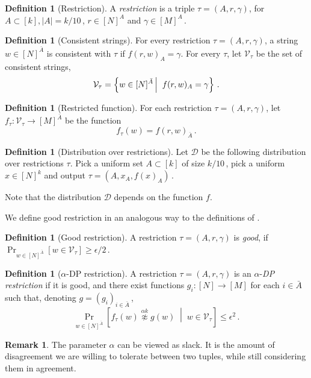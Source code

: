 \documentclass[11pt]{article}
\numberwithin{equation}{section}
\theoremstyle{definition}
\newtheorem{definition}[theorem]{Definition}
\newtheorem{remark}[theorem]{Remark}
\theoremstyle{plain}
\newcommand{\Prob}[2][]{\Pr_{{#1}}\left[#2\right]} %
\newcommand{\brac}[1]{[#1]} %
\newcommand{\abs}[1]{\lvert#1\rvert} %
\newcommand{\given}{\;\middle\vert\;} %
\newcommand\sett[2]{\left\{ #1 \left| \; \vphantom{#1 #2} \right. #2  \right\}} %
\newcommand\f{f} %
\newcommand{\g}{g} %
\newcommand\neqg[1]{\stackrel{{#1}}{ \not\approx}} %
\newcommand\cons{\mathcal{V}} %
\newcommand\rest[1]{{\bar{#1}}}  %
\begin{document}
\begin{definition}[Restriction]
A \emph{restriction} is a triple $\tau = (A,r,\gamma)$, for $A\subset[k],\abs{A}=k/10$\,, $r\in[N]^A$ and $\gamma\in[M]^A$\,.
\end{definition}
%
\begin{definition}[Consistent strings]
	For every restriction $\tau = (A,r,\gamma)$, a string $w\in[N]^{\rest{A}}$ is consistent with $\tau$ if $ \f(r,w)_A =\gamma $.
	For every $\tau$, let $\cons_{\tau}$ be the set of consistent strings,
	\[\cons_{\tau} = \sett{ w\in[N]^{\rest{A}}}{  \f(r,w)_A =\gamma }\,.\] %
\end{definition}
%
\begin{definition}[Restricted function]
	For each restriction $\tau = (A,r,\gamma)$, let $f_{\tau}:\cons_\tau\rightarrow[M]^{\bar{A}}$ be the function
	\[f_{\tau}(w) = \f(r,w)_\rest{A}\,.\] %
\end{definition}

\begin{definition}[Distribution over restrictions]\label{def:distribution}
	Let $\mathcal{D}$ be the following distribution over restrictions $\tau$. Pick a uniform set $A\subset[k]$ of size $k/10$\,, pick a uniform $x\in[N]^k$ and output $\tau = (A,x_A,\f(x)_A)$\,.
\end{definition}
Note that the distribution $\mathcal{D}$ depends on the function $f$.

We define good restriction in an analogous way to the definitions of \cite{impagliazzo2012new}. 

\begin{definition}[Good restriction]\label{def:good rest}
	A restriction $\tau = (A,r,\gamma)$ is \emph{good}, if $ \Pr_{w\in[N]^{\rest{A}}}[w\in \cons_{\tau}] \geq 
	\epsilon/2$\,. %
\end{definition}

\begin{definition}[$\alpha$-DP restriction]\label{def:DP rest}
	A restriction $\tau = (A,r,\gamma)$ is an $\alpha$-\emph{DP restriction} if it is good, and there exist functions $\g_i:[N]\rightarrow[M]$ for each $i\in \bar A$ such that, denoting $g = (g_i)_{i\in \bar A}$\,, 
	\[	\Prob[w\in\brac{N}^{\rest{A}}]{\f_\tau(w) \neqg{\alpha k} \g(w) \given w\in\mathcal{V}_\tau} \leq \epsilon^{2 }\,.\] %
\end{definition}
\begin{remark}
The parameter $\alpha$ can be viewed as slack. It is the amount of disagreement we are willing to tolerate between two tuples, while still considering them in agreement.
\end{remark}
\end{document}
